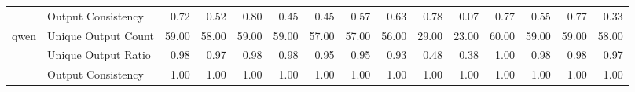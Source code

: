 \begin{tabular}{llrrrrrrrrrrrrr}
 & Output Consistency & 0.72 & 0.52 & 0.80 & 0.45 & 0.45 & 0.57 & 0.63 & 0.78 & 0.07 & 0.77 & 0.55 & 0.77 & 0.33 \\
\cline{1-15}
\multirow[t]{3}{*}{qwen} & Unique Output Count & 59.00 & 58.00 & 59.00 & 59.00 & 57.00 & 57.00 & 56.00 & 29.00 & 23.00 & 60.00 & 59.00 & 59.00 & 58.00 \\
 & Unique Output Ratio & 0.98 & 0.97 & 0.98 & 0.98 & 0.95 & 0.95 & 0.93 & 0.48 & 0.38 & 1.00 & 0.98 & 0.98 & 0.97 \\
 & Output Consistency & 1.00 & 1.00 & 1.00 & 1.00 & 1.00 & 1.00 & 1.00 & 1.00 & 1.00 & 1.00 & 1.00 & 1.00 & 1.00 \\
\cline{1-15}
\bottomrule
\end{tabular}
